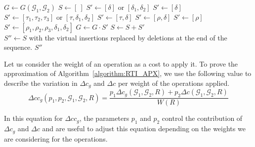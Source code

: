 \documentclass[12pt]{article}
\begin{document}
\begin{algorithm}
\caption{The input is a pair of genomes $\mathcal{G}_1$ and $\mathcal{G}_2$. The output is a sequence $S''$ of reversal, transposition and indel operations such that $\mathcal{G}_1
  \cdot S'' = \mathcal{G}_2$.}\label{algorithm:RTI_APX}
\begin{algorithmic}
\State $G \gets G(\mathcal{G}_1,\mathcal{G}_2)$
\State $S \gets [~]$
        \State $S' \gets [\delta]$ or $[\delta_1, \delta_2]$ 
        \State $S' \gets [\delta]$ 
        \State $S' \gets [\tau_1,\tau_2,\tau_3] \text{ or } [\tau,\delta_1,\delta_2]$ 
        \State $S' \gets [\tau,\delta]$ 
        \State $S' \gets [\rho,\delta]$ 
        \State $S' \gets [\rho]$ 
    \Else
        \State $S' \gets [\rho_1,\rho_2,\rho_3,\delta_1,\delta_2]$ 
    \EndIf
    \State $G \gets G \cdot S'$
    \State $S \gets S + S'$
\EndWhile \\
$S'' \gets S$ with the virtual insertions replaced by deletions at the end of the sequence.
\Return $S''$
\end{algorithmic}
\end{algorithm}

Let us consider the weight of an operation as a cost to apply it. To prove the approximation of Algorithm~\ref{algorithm:RTI_APX}, we use the following value to describe the variation in $\Delta c_g$ and $\Delta c$ per weight of the operations applied.
$$
    \Delta c c_g(p_1,p_2,\mathcal{G}_1,\mathcal{G}_2,R) = \frac{p_1 \Delta c_g(\mathcal{G}_1,\mathcal{G}_2,R) + p_2 \Delta c(\mathcal{G}_1,\mathcal{G}_2,R)}{W(R)}
$$

In this equation for $\Delta c c_g$, the parameters $p_1$ and $p_2$ control the contribution of $\Delta c_g$ and $\Delta c$ and are useful to adjust this equation depending on the weights we are considering for the operations.
\end{document}
